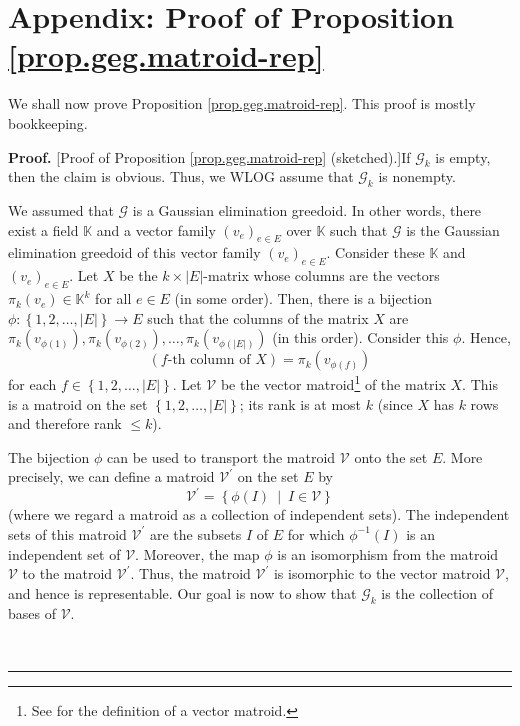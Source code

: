 \documentclass[numbers=enddot,12pt,final,onecolumn,notitlepage]{scrartcl}%
\theoremstyle{definition}
\newenvironment{proof}[1][Proof]{\noindent\textbf{#1.} }{\ \rule{0.5em}{0.5em}}
\renewcommand{\leq}{\leqslant}
\theoremstyle{plainsl}
\begin{document}
\section{\label{sect.matroid-rep}Appendix: Proof of Proposition
\ref{prop.geg.matroid-rep}}

We shall now prove Proposition \ref{prop.geg.matroid-rep}. This proof is
mostly bookkeeping.

\begin{proof}
[Proof of Proposition \ref{prop.geg.matroid-rep} (sketched).]If $\mathcal{G}%
_{k}$ is empty, then the claim is obvious. Thus, we WLOG assume that
$\mathcal{G}_{k}$ is nonempty.

We assumed that $\mathcal{G}$ is a Gaussian elimination greedoid. In other
words, there exist a field $\mathbb{K}$ and a vector family $\left(
v_{e}\right)  _{e\in E}$ over $\mathbb{K}$ such that $\mathcal{G}$ is the
Gaussian elimination greedoid of this vector family $\left(  v_{e}\right)
_{e\in E}$. Consider these $\mathbb{K}$ and $\left(  v_{e}\right)  _{e\in E}$.
Let $X$ be the $k\times\left\vert E\right\vert $-matrix whose columns are the
vectors $\pi_{k}\left(  v_{e}\right)  \in\mathbb{K}^{k}$ for all $e\in E$ (in
some order). Then, there is a bijection $\phi:\left\{  1,2,\ldots,\left\vert
E\right\vert \right\}  \rightarrow E$ such that the columns of the matrix $X$
are $\pi_{k}\left(  v_{\phi\left(  1\right)  }\right)  ,\pi_{k}\left(
v_{\phi\left(  2\right)  }\right)  ,\ldots,\pi_{k}\left(  v_{\phi\left(
\left\vert E\right\vert \right)  }\right)  $ (in this order). Consider this
$\phi$. Hence,%
\begin{equation}
\left(  f\text{-th column of }X\right)  =\pi_{k}\left(  v_{\phi\left(
f\right)  }\right)  \label{pf.prop.geg.matroid-rep.fcolX=}%
\end{equation}
for each $f\in\left\{  1,2,\ldots,\left\vert E\right\vert \right\}  $. Let
$\mathcal{V}$ be the vector matroid\footnote{See \cite[\S 1.1]{Oxley11} for
the definition of a vector matroid.} of the matrix $X$. This is a matroid on
the set $\left\{  1,2,\ldots,\left\vert E\right\vert \right\}  $; its rank is
at most $k$ (since $X$ has $k$ rows and therefore rank $\leq k$).

The bijection $\phi$ can be used to transport the matroid $\mathcal{V}$ onto
the set $E$. More precisely, we can define a matroid $\mathcal{V}^{\prime}$ on
the set $E$ by%
\[
\mathcal{V}^{\prime}=\left\{  \phi\left(  I\right)  \ \mid\ I\in
\mathcal{V}\right\}
\]
(where we regard a matroid as a collection of independent sets). The
independent sets of this matroid $\mathcal{V}^{\prime}$ are the subsets $I$ of
$E$ for which $\phi^{-1}\left(  I\right)  $ is an independent set of
$\mathcal{V}$. Moreover, the map $\phi$ is an isomorphism from the matroid
$\mathcal{V}$ to the matroid $\mathcal{V}^{\prime}$. Thus, the matroid
$\mathcal{V}^{\prime}$ is isomorphic to the vector matroid $\mathcal{V}$, and
hence is representable. Our goal is now to show that $\mathcal{G}_{k}$ is the
collection of bases of $\mathcal{V}$.


\end{proof}
\end{document}
